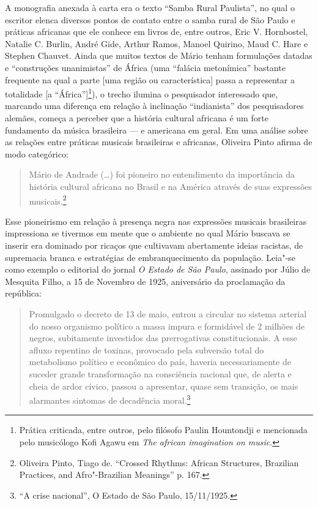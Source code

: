 A monografia anexada à carta era o texto ``Samba Rural Paulista'', no
qual o escritor elenca diversos pontos de contato entre o samba rural de
São Paulo e práticas africanas que ele conhece em livros de, entre
outros, Eric V. Hornbostel, Natalie C. Burlin, André Gide, Arthur Ramos,
Manoel Quirino, Maud C. Hare e Stephen Chauvet. Ainda que muitos textos
de Mário tenham formulações datadas e ``construções unanimistas'' de
África (uma ``falácia metonímica'' bastante frequente na qual a parte
{[}uma região ou característica{]} passa a representar a totalidade {[}a
``África''{]}\footnote{Prática criticada, entre outros, pelo filósofo
  Paulin Hountondji e mencionada pelo musicólogo Kofi Agawu em \emph{The
  african imagination on music}.}), o trecho ilumina o pesquisador
interessado que, marcando uma diferença em relação à inclinação
``indianista'' dos pesquisadores alemães, começa a perceber que a
história cultural africana é um forte fundamento da música brasileira ---
e americana em geral. Em uma análise sobre as relações entre práticas
musicais brasileiras e africanas, Oliveira Pinto afirma de modo
categórico:

\begin{quote}
Mário de Andrade (\ldots{}) foi pioneiro no entendimento da importância da
história cultural africana no Brasil e na América através de suas
expressões musicais.\footnote{Oliveira Pinto, Tiago de. ``Crossed
  Rhythms: African Structures, Brazilian Practices, and Afro"-Brazilian
  Meanings'' p. 167.}
\end{quote}

Esse pioneirismo em relação à presença negra nas expressões musicais
brasileiras impressiona se tivermos em mente que o ambiente no qual
Mário buscava se inserir era dominado por ricaços que cultivavam
abertamente ideias racistas, de supremacia branca e estratégias de
embranquecimento da população. Leia"-se como exemplo o editorial do
jornal \emph{O Estado de São Paulo}, assinado por Júlio de Mesquita
Filho, a 15 de Novembro de 1925, aniversário da proclamação da
república:

\begin{quote}
Promulgado o decreto de 13 de maio, entrou a circular no sistema
arterial do nosso organismo político a massa impura e formidável de 2
milhões de negros, subitamente investidos das prerrogativas
constitucionais. A esse afluxo repentino de toxinas, provocado pela
subversão total do metabolismo político e econômico do país, haveria
necessariamente de suceder grande transformação na consciência nacional
que, de alerta e cheia de ardor cívico, passou a apresentar, quase sem
transição, os mais alarmantes sintomas de decadência moral.\footnote{``A
  crise nacional'', O Estado de São Paulo, 15/11/1925.}
\end{quote}

